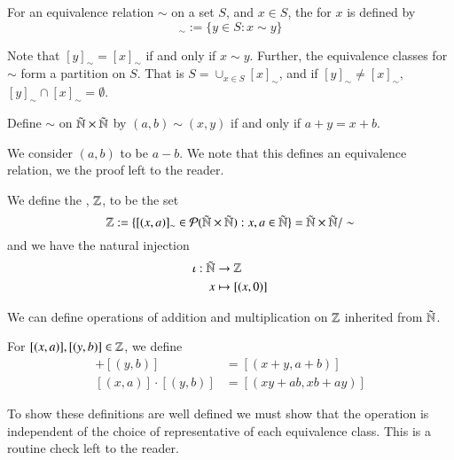 \begin{definition}
    For an equivalence relation $\sim$ on a set $S$, and $x \in S$, the  for $x$ is defined by \begin{equation*}
        [x]_{\sim} := \{y \in S: x \sim y\}
    \end{equation*}
\end{definition}

Note that $[y]_{\sim} = [x]_{\sim}$ if and only if $x \sim y$. Further, the equivalence classes for $\sim $ form a partition on $S$. That is $S = \cup_{x \in S}[x]_{\sim}$, and if $[y]_{\sim} \neq [x]_{\sim},$ $[y]_{\sim}\cap[x]_{\sim} = \emptyset$.

\begin{definition}
    Define $\sim$ on $\tilde{\mathbb N}\times \tilde{\mathbb N}$ by $(a,b) \sim(x,y)$ if and only if $a+y = x+b$.
\end{definition}
We consider $(a,b)$ to be $a-b$. We note that this defines an equivalence relation, we the proof left to the reader.

\begin{definition}
    We define the , $\mathbb Z$, to be the set \begin{equation*}
        \mathbb Z := \{[(x,a)]_{\sim} \in \mathcal{P}(\tilde{\mathbb N}\times\tilde{\mathbb N}): x,a \in \tilde{\mathbb N}\} = \tilde{\mathbb N}\times\tilde{\mathbb N}/\sim
    \end{equation*}
    and we have the natural injection \begin{align*}
        \iota:\tilde{\mathbb N}&\rightarrow \mathbb Z \\
        x&\mapsto [(x,0)]
    \end{align*}
\end{definition}

We can define operations of addition and multiplication on $\mathbb Z$ inherited from $\tilde{\mathbb N}$.

\begin{definition}
    For $[(x,a)],[(y,b)] \in \mathbb Z$, we define \begin{align*}
        [(x,a)]+[(y,b)] &= [(x+y,a+b)] \\
        [(x,a)]\cdot[(y,b)] &= [(xy + ab, xb + ay)]
    \end{align*}
\end{definition}
To show these definitions are well defined we must show that the operation is independent of the choice of representative of each equivalence class. This is a routine check left to the reader.

